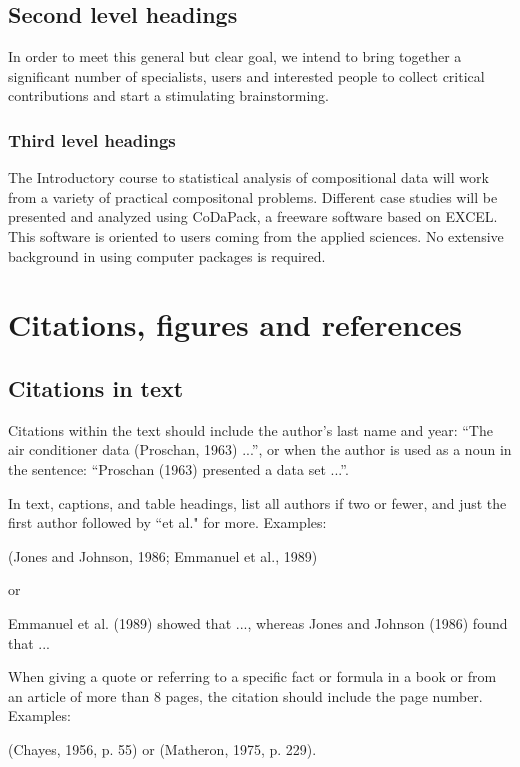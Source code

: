 \documentclass [10pt]{article}
\begin{document}
\subsection{Second level headings}
In order to meet this general but clear goal, we intend to bring together a significant number of specialists, users and interested people to collect critical contributions and start a stimulating brainstorming.

\subsubsection{Third level headings}
The Introductory course to statistical analysis of compositional data will work from a variety of practical compositonal problems. Different case studies will be presented and analyzed using CoDaPack, a freeware software based on EXCEL. This software is oriented to users coming from the applied sciences. No extensive background in using computer packages is
required.


\section{Citations, figures and references}
\subsection{Citations in text}
Citations within the text should include the author's last name and year: ``The air conditioner data (Proschan,
1963) ...'', or when the author is used as a noun in the sentence: ``Proschan (1963) presented a data set ...''.

In text, captions, and table headings, list all authors if two or fewer, and just the first author followed by ``et al." for more. Examples:

\begin{center}
(Jones and Johnson, 1986; Emmanuel et al., 1989)
\end{center}
or
\begin{center}
Emmanuel et al. (1989) showed that ..., whereas Jones and Johnson (1986) found that ...
\end{center}

When giving a quote or referring to a specific fact or formula in a book or from an article of more than 8 pages, the citation should include the page number. Examples:

\begin{center}
(Chayes, 1956, p. 55) or (Matheron, 1975, p. 229).
\end{center}
\end{document}
